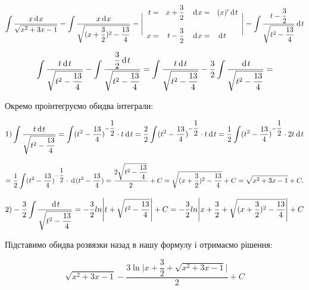 {}


$$
  \int \dfrac{x\hspace{2pt}\text{d}\hspace{1pt}{x}}{\sqrt{x^2+3x-1}}
= \int \dfrac{x\hspace{2pt}\text{d}\hspace{1pt}{x}}{\sqrt{(x+\dfrac{3}{2})^2-\dfrac{13}{4}}}
= \Bigg |
  \begin{array}{rrrl}
    t = & x + \dfrac{3}{2} & \hspace{2pt}\text{d}\hspace{1pt}{x} =& (x)'\hspace{2pt}\text{d}\hspace{1pt}{t}\\
    \\
    x = & t - \dfrac{3}{2} & \hspace{2pt}\text{d}\hspace{1pt}{x} =& \hspace{2pt}\text{d}\hspace{1pt}{t}\\
  \end{array}
\Bigg |
= \int \dfrac{t-\dfrac{3}{2}}{\sqrt{t^2-\dfrac{13}{4}}} \hspace{2pt}\text{d}\hspace{1pt}{t}
$$

$$
\int \dfrac{t\hspace{2pt}\text{d}\hspace{1pt}{t}}{\sqrt{t^2-\dfrac{13}{4}}}  - \int \dfrac{\dfrac{3}{2}\hspace{2pt}\text{d}\hspace{1pt}{t}}{\sqrt{t^2-\dfrac{13}{4}}}
= \int \dfrac{t\hspace{2pt}\text{d}\hspace{1pt}{t}}{\sqrt{t^2-\dfrac{13}{4}}}  - \dfrac{3}{2} \int \dfrac{\hspace{2pt}\text{d}\hspace{1pt}{t}}{\sqrt{t^2-\dfrac{13}{4}}}
=
$$

Окремо проінтегруємо обидва інтеграли:

$$
1)  \int \dfrac{t\hspace{2pt}\text{d}\hspace{1pt}{t}}{\sqrt{t^2-\dfrac{13}{4}}}
= \int (t^2-\dfrac{13}{4})^{-\dfrac{1}{2}} \cdot t\hspace{2pt}\text{d}\hspace{1pt}{t}
= \dfrac{2}{2} \int (t^2-\dfrac{13}{4})^{-\dfrac{1}{2}} \cdot t\hspace{2pt}\text{d}\hspace{1pt}{t}
= \dfrac{1}{2} \int (t^2-\dfrac{13}{4})^{-\dfrac{1}{2}} \cdot 2t\hspace{2pt}\text{d}\hspace{1pt}{t}
$$

$$
= \dfrac{1}{2} \int (t^2-\dfrac{13}{4})^{-\dfrac{1}{2}} \cdot \hspace{2pt}\text{d}\hspace{1pt}{(t^2-\dfrac{13}{4})}
= \dfrac{2 \sqrt{t^2-\dfrac{13}{4}}}{2} + C
= \sqrt{(x + \dfrac{3}{2})^2-\dfrac{13}{4}} + C
= \sqrt{x^2+3x-1} + C.
$$


$$
2)
  - \dfrac{3}{2} \int \dfrac{\hspace{2pt}\text{d}\hspace{1pt}{t}}{\sqrt{t^2-\dfrac{13}{4}}} = - \dfrac{3}{2}  ln \Bigg|t + \sqrt{t^2-\dfrac{13}{4}}\Bigg| + C = - \dfrac{3}{2}  ln \Bigg|x + \dfrac{3}{2} + \sqrt{(x + \dfrac{3}{2})^2-\dfrac{13}{4}}\Bigg| + C
$$

Підставимо обидва розвязки назад в нашу формулу і отримаємо рішення:

$$
\sqrt{x^2+3x-1} - \dfrac{3 \ln{\bigg|x + \dfrac{3}{2} + \sqrt{x^2+3x-1}\bigg|} }{2} + C
$$
